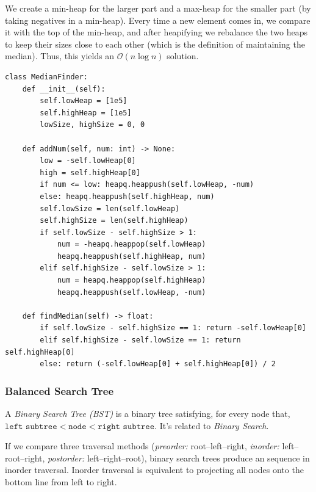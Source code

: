 \documentclass{article}
\begin{document}
We create a min-heap for the larger part and a max-heap for the smaller part (by taking negatives in a min-heap). Every time a new element comes in, we compare it with the top of the min-heap, and after heapifying we rebalance the two heaps to keep their sizes close to each other (which is the definition of maintaining the median). Thus, this yields an $\mathcal O(n\log n)$ solution.

\begin{lstlisting}[style=python]
class MedianFinder:
    def __init__(self):
        self.lowHeap = [1e5]
        self.highHeap = [1e5]
        lowSize, highSize = 0, 0

    def addNum(self, num: int) -> None:
        low = -self.lowHeap[0]
        high = self.highHeap[0]
        if num <= low: heapq.heappush(self.lowHeap, -num)
        else: heapq.heappush(self.highHeap, num)
        self.lowSize = len(self.lowHeap)
        self.highSize = len(self.highHeap)
        if self.lowSize - self.highSize > 1:
            num = -heapq.heappop(self.lowHeap)
            heapq.heappush(self.highHeap, num)
        elif self.highSize - self.lowSize > 1:
            num = heapq.heappop(self.highHeap)
            heapq.heappush(self.lowHeap, -num)

    def findMedian(self) -> float:
        if self.lowSize - self.highSize == 1: return -self.lowHeap[0]
        elif self.highSize - self.lowSize == 1: return self.highHeap[0]
        else: return (-self.lowHeap[0] + self.highHeap[0]) / 2
\end{lstlisting}


\subsubsection{Balanced Search Tree}

A \emph{Binary Search Tree (BST)} is a binary tree satisfying, for every node that, $\texttt{left subtree}<\texttt{node}<\texttt{right subtree}$. It's related to \emph{Binary Search}.

If we compare three traversal methods (\emph{preorder:} root–left–right, \emph{inorder:} left–root–right, \emph{postorder:} left–right–root), binary search trees produce an sequence in inorder traversal. Inorder traversal is equivalent to projecting all nodes onto the bottom line from left to right.
\end{document}
